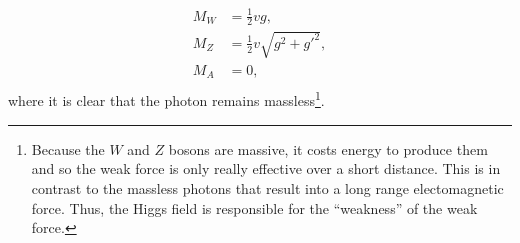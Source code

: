 \begin{equation}
\label{eq:massesHiggs}
\begin{split}
M_W &= \frac{1}{2}vg,\\
M_Z &= \frac{1}{2}v\sqrt{g^2+g'^2},\\
M_A &= 0,\\
\end{split}
\end{equation}
where it is clear that the photon remains massless\footnote{Because the $W$ and $Z$ bosons are massive, it costs energy to produce them and so the weak force is only really effective over a short distance. This is in contrast to the massless photons that result into a long range electomagnetic force. Thus, the Higgs field is responsible for the ``weakness'' of the weak force.}.






